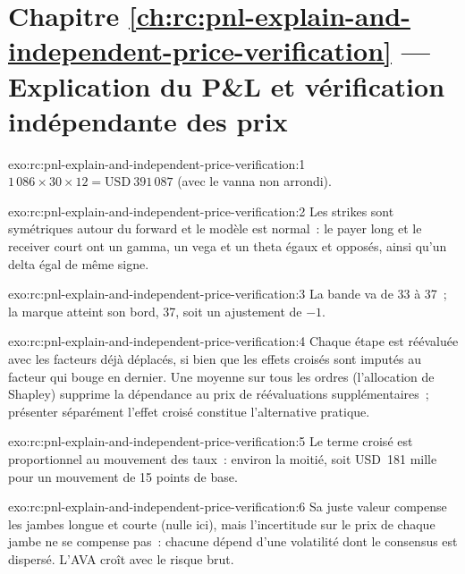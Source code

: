 \section*{Chapitre \ref{ch:rc:pnl-explain-and-independent-price-verification} --- Explication du P\&L et vérification indépendante des prix}

\begin{solution}{exo:rc:pnl-explain-and-independent-price-verification:1}
$1\,086\times30\times12 = \text{USD}~391\,087$ (avec le vanna non arrondi).
\end{solution}

\begin{solution}{exo:rc:pnl-explain-and-independent-price-verification:2}
Les strikes sont symétriques autour du forward et le modèle est normal~: le payer long et le receiver court
ont un gamma, un vega et un theta égaux et opposés, ainsi qu'un delta égal de même signe.
\end{solution}

\begin{solution}{exo:rc:pnl-explain-and-independent-price-verification:3}
La bande va de 33 à 37~; la marque atteint son bord, 37, soit un ajustement de $-1$.
\end{solution}

\begin{solution}{exo:rc:pnl-explain-and-independent-price-verification:4}
Chaque étape est réévaluée avec les facteurs déjà déplacés, si bien que les effets croisés sont imputés au facteur
qui bouge en dernier. Une moyenne sur tous les ordres (l'allocation de Shapley) supprime la dépendance au prix de
réévaluations supplémentaires~; présenter séparément l'effet croisé constitue l'alternative pratique.
\end{solution}

\begin{solution}{exo:rc:pnl-explain-and-independent-price-verification:5}
Le terme croisé est proportionnel au mouvement des taux~: environ la moitié, soit USD~181 mille pour un mouvement de 15 points de base.
\end{solution}

\begin{solution}{exo:rc:pnl-explain-and-independent-price-verification:6}
Sa juste valeur compense les jambes longue et courte (nulle ici), mais l'incertitude sur le prix de chaque jambe ne
se compense pas~: chacune dépend d'une volatilité dont le consensus est dispersé. L'AVA croît avec le risque brut.
\end{solution}

